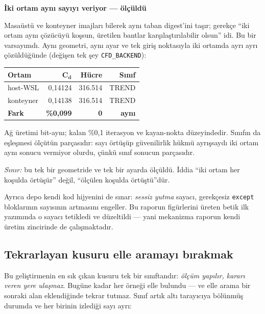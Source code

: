 \documentclass[11pt,a4paper]{article}
\newcommand{\kkkenar}{lacivert}
\newcommand{\kkzemin}{kod}
\newenvironment{renkkutu}[3]{%
  \renewcommand{\kkkenar}{#1}\renewcommand{\kkzemin}{#2}%
  \par\medskip\noindent
  \begin{lrbox}{\kutugovde}%
  \begin{minipage}{\dimexpr\linewidth-2\fboxsep-2\fboxrule\relax}\footnotesize
  \textcolor{#1}{\textbf{#3}}\par\vspace{3pt}%
}{%
  \end{minipage}%
  \end{lrbox}%
  \noindent\fcolorbox{\kkkenar}{\kkzemin}{\usebox{\kutugovde}}%
  \par\medskip
}
\newenvironment{anafikir}[1]{\begin{renkkutu}{lacivert}{kod}{#1}}{\end{renkkutu}}
\begin{document}
\begin{anafikir}{İki ortam aynı sayıyı veriyor --- ölçüldü}
Masaüstü ve konteyner imajları bilerek aynı taban digest'ini taşır; gerekçe
``iki ortam aynı çözücüyü koşsun, üretilen bantlar karşılaştırılabilir olsun''
idi. Bu bir varsayımdı. Aynı geometri, aynı ayar ve tek giriş noktasıyla iki
ortamda ayrı ayrı çözüldüğünde (değişen tek şey \texttt{CFD\_BACKEND}):

\begin{center}\footnotesize
\begin{tabular}{@{}lrrr@{}}
\toprule
\textbf{Ortam} & $\boldsymbol{C_d}$ & \textbf{Hücre} & \textbf{Sınıf} \\
\midrule
host-WSL   & 0{,}14124 & 316.514 & TREND \\
konteyner  & 0{,}14138 & 316.514 & TREND \\
\midrule
\textbf{Fark} & \textbf{\%0{,}099} & \textbf{0} & \textbf{aynı} \\
\bottomrule
\end{tabular}
\end{center}

Ağ üretimi bit-aynı; kalan \%0,1 iterasyon ve kayan-nokta düzeyindedir. Sınıfın
da eşleşmesi ölçütün parçasıdır: sayı örtüşüp güvenilirlik hükmü ayrışsaydı iki
ortam aynı sonucu vermiyor olurdu, çünkü sınıf sonucun parçasıdır.

\emph{Sınır:} bu tek bir geometride ve tek bir ayarda ölçüldü. İddia ``iki ortam
her koşulda örtüşür'' değil, ``ölçülen koşulda örtüştü''dür.
\end{anafikir}

Ayrıca depo kendi kod hijyenini de sınar: \emph{sessiz yutma} sayacı, gerekçesiz
\texttt{except} bloklarının sayısının artmasını engeller. Bu raporun figürlerini
üreten betik ilk yazımında o sayacı tetikledi ve düzeltildi --- yani mekanizma
raporun kendi üretim zincirinde de çalışmaktadır.

\subsection{Tekrarlayan kusuru elle aramayı bırakmak}

Bu geliştirmenin en sık çıkan kusuru tek bir sınıftandır: \emph{ölçüm yapılır,
kararı veren yere ulaşmaz}. Bugüne kadar her örneği elle bulundu --- ve elle
arama bir sonraki alan eklendiğinde tekrar tutmaz. Sınıf artık altı tarayıcıya
bölünmüş durumda ve her birinin izlediği sayı ayrı:
\end{document}
